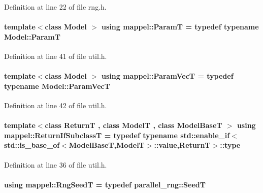 Definition at line 22 of file rng.\+h.

\paragraph[{\texorpdfstring{ParamT}{ParamT}}]{\setlength{\rightskip}{0pt plus 5cm}template$<$class Model $>$ using {\bf mappel\+::\+ParamT} = typedef typename Model\+::\+ParamT}\hypertarget{namespacemappel_a667925cb0d6c0e49f2f035cc5a9a6857}{}\label{namespacemappel_a667925cb0d6c0e49f2f035cc5a9a6857}


Definition at line 41 of file util.\+h.

\paragraph[{\texorpdfstring{Param\+VecT}{ParamVecT}}]{\setlength{\rightskip}{0pt plus 5cm}template$<$class Model $>$ using {\bf mappel\+::\+Param\+VecT} = typedef typename Model\+::\+Param\+VecT}\hypertarget{namespacemappel_a0f86d3153e4e27b095012f140eea58de}{}\label{namespacemappel_a0f86d3153e4e27b095012f140eea58de}


Definition at line 42 of file util.\+h.

\paragraph[{\texorpdfstring{Return\+If\+SubclassT}{ReturnIfSubclassT}}]{\setlength{\rightskip}{0pt plus 5cm}template$<$class ReturnT , class ModelT , class Model\+BaseT $>$ using {\bf mappel\+::\+Return\+If\+SubclassT} = typedef typename std\+::enable\+\_\+if$<$std\+::is\+\_\+base\+\_\+of$<$Model\+BaseT,ModelT$>$\+::value,ReturnT$>$\+::type}\hypertarget{namespacemappel_a3b77d227658ba3ba9e16fea6fa6e626d}{}\label{namespacemappel_a3b77d227658ba3ba9e16fea6fa6e626d}


Definition at line 36 of file util.\+h.

\paragraph[{\texorpdfstring{Rng\+SeedT}{RngSeedT}}]{\setlength{\rightskip}{0pt plus 5cm}using {\bf mappel\+::\+Rng\+SeedT} = typedef parallel\+\_\+rng\+::\+SeedT}\hypertarget{namespacemappel_a318bca259a7add5979160939a3f4e60b}{}\label{namespacemappel_a318bca259a7add5979160939a3f4e60b}


